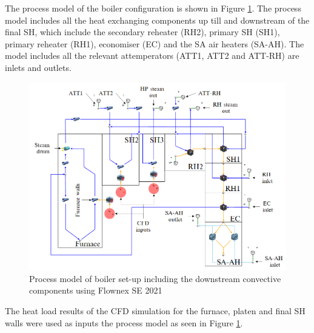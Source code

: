 \documentclass[review]{elsarticle}
\begin{document}
The process model of the boiler configuration is shown in Figure \ref{fig_flownex}. The process model includes all the heat exchanging components up till and downstream of the final SH, which include the secondary reheater (RH2), primary SH (SH1), primary reheater (RH1), economiser (EC) and the SA air heaters (SA-AH). The model includes all the relevant attemperators (ATT1, ATT2 and ATT-RH) are inlets and outlets.
\begin{figure}[h!]
\centering
\includegraphics[scale=0.5]{FLOWNEX_SETUP}
\caption{Process model of boiler set-up including the downstream convective components using Flownex SE 2021}
\label{fig_flownex}
\end{figure}

The heat load results of the CFD simulation for the furnace, platen and final SH walls were used as inputs the process model as seen in Figure \ref{fig_flownex}. 
\newpage
\end{document}
